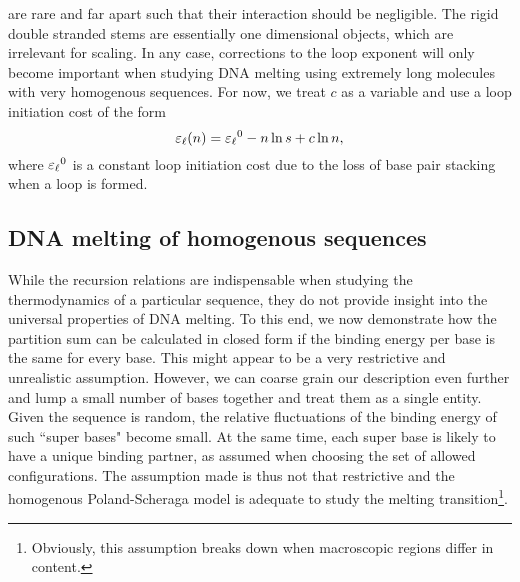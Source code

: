 are rare and far apart such that their interaction should be negligible. The rigid double stranded 
stems are essentially one dimensional objects, which are irrelevant for scaling. In any case, 
corrections to the loop exponent will only become important when studying DNA melting 
using extremely long molecules with very homogenous sequences.
For now, we treat $c$ as a variable and use a loop initiation cost of the form
\begin{equation}
\label{eq:loopcost}
{\varepsilon_{\ell}}(n)={\varepsilon_{\ell}}^{0} -n\ln s + c\ln n,
\end{equation}
where ${\varepsilon_{\ell}}^{0}$ is a constant loop initiation cost due to the loss of base pair stacking
when a loop is formed. 

\subsection{\label{sec:DNA_melting_homo}DNA melting of homogenous sequences}
While the recursion relations are indispensable when studying the thermodynamics of
a particular sequence, they do not provide insight into the universal properties of DNA melting. 
To this end, we now demonstrate how the partition sum can be calculated in closed
form if the binding energy per base is the same for every base.  This might appear
to be a very restrictive and unrealistic assumption. However, we can coarse grain our 
description even further and lump a small number of bases together and treat them 
as a single entity. Given the sequence is random, the relative fluctuations of the 
binding energy of such ``super bases" become small. At the same time, each super base is likely to have a unique binding partner,
as assumed when choosing the set of allowed configurations. 
The assumption made is thus not that restrictive and the homogenous Poland-Scheraga 
model is adequate to study the melting transition\footnote{Obviously, this assumption
breaks down when macroscopic regions differ in  content.
}.


